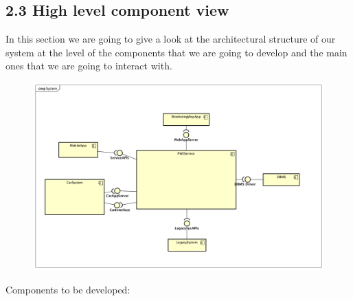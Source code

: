 \documentclass[]{article}
\begin{document}
\subsection{2.3 High level component
view}\label{high-level-component-view}

In this section we are going to give a look at the architectural
structure of our system at the level of the components that we are going
to develop and the main ones that we are going to interact with.
\newline

\begin{figure}[htbp]
\centering
\includegraphics[width=1.00000\textwidth,height=1.00000\textwidth]{./comp_diagrams/System.png}
\caption{}\label{id}
\end{figure}

Components to be developed:
\end{document}
